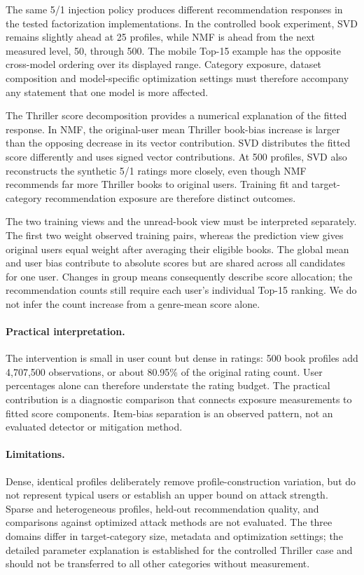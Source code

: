 \documentclass[information,article,submit,pdftex,moreauthors]{Definitions/mdpi}
\begin{document}
The same 5/1 injection policy produces different recommendation responses in the tested factorization implementations. In the controlled book experiment, SVD remains slightly ahead at 25 profiles, while NMF is ahead from the next measured level, 50, through 500. The mobile Top-15 example has the opposite cross-model ordering over its displayed range. Category exposure, dataset composition and model-specific optimization settings must therefore accompany any statement that one model is more affected.

The Thriller score decomposition provides a numerical explanation of the fitted response. In NMF, the original-user mean Thriller book-bias increase is larger than the opposing decrease in its vector contribution. SVD distributes the fitted score differently and uses signed vector contributions. At 500 profiles, SVD also reconstructs the synthetic 5/1 ratings more closely, even though NMF recommends far more Thriller books to original users. Training fit and target-category recommendation exposure are therefore distinct outcomes.

The two training views and the unread-book view must be interpreted separately. The first two weight observed training pairs, whereas the prediction view gives original users equal weight after averaging their eligible books. The global mean and user bias contribute to absolute scores but are shared across all candidates for one user. Changes in group means consequently describe score allocation; the recommendation counts still require each user's individual Top-15 ranking. We do not infer the count increase from a genre-mean score alone.

\paragraph{Practical interpretation.}
The intervention is small in user count but dense in ratings: 500 book profiles add 4,707,500 observations, or about 80.95\% of the original rating count. User percentages alone can therefore understate the rating budget. The practical contribution is a diagnostic comparison that connects exposure measurements to fitted score components. Item-bias separation is an observed pattern, not an evaluated detector or mitigation method.

\paragraph{Limitations.}
Dense, identical profiles deliberately remove profile-construction variation, but do not represent typical users or establish an upper bound on attack strength. Sparse and heterogeneous profiles, held-out recommendation quality, and comparisons against optimized attack methods are not evaluated. The three domains differ in target-category size, metadata and optimization settings; the detailed parameter explanation is established for the controlled Thriller case and should not be transferred to all other categories without measurement.
\end{document}
